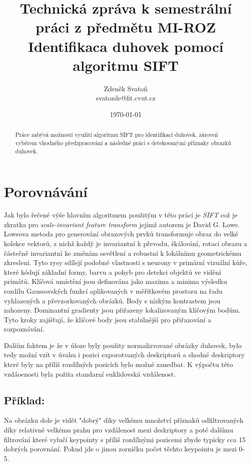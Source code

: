 \documentclass[a4paper,10pt,twocolumn]{article}
\title{Technická zpráva k semestrální práci z předmětu MI-ROZ \\ Identifikaca duhovek pomocí algoritmu SIFT}
\date{\today}
\author{Zdeněk Svatoň\\ svatozde@fit.cvut.cz}
\begin{document}
\maketitle
\begin{abstract}
Práce zabývá možností využití algoritmu SIFT pro identifikaci duhovek, zároveň vyběrem vhodného předzpracování a následné práci s detekovanými příznaky obrazků duhovek.
\end{abstract}

%
\section{Porovnávání}

Jak bylo řečené výše hlavním algoritmem použitým v této prácí je \emph{SIFT} což je zkratka pro \emph{scale-invariant feature transform} jejímž autorem je David G. Lowe.
Loweova metoda pro generování obrazových prvků transformuje obraz do velké kolekce vektorů, z nichž každý je invariantní k převodu, škálování, rotaci obrazu a částečně invariantní ke změnám osvětlení a robustní k lokálnímu geometrickému zkreslení.
Tyto rysy sdílejí podobné vlastnosti s neurony v primární vizuální kůře, které kódují základní formy, barvu a pohyb pro detekci objektů ve vidění primátů.
Klíčová umístění jsou definována jako maxima a minima výsledku rozdílu Gaussovských funkcí aplikovaných v měřítkovém prostoru na řadu vyhlazených a převzorkovaných obrázků. Body s nízkým kontrastem jsou zahozeny.
Dominantní gradienty jsou přiřazeny lokalizovaným klíčovým bodům. Tyto kroky zajišťují, že klíčové body jsou stabilnější pro přiřazování a rozpoznávání.

Dalším faktem je že v úloze byly použity normalizvované obrázky duhovek, bylo tedy možní vzít v úvahu i pozici exporotvaných deskriptorů a shodné deskriptory které byly na příliš rozdílných pozicích bylo možné zanedbat.
K výpočtu této vzdáoenosti byla požita standarní euklidovská vzdálenost.

\subsection{Příklad:}  Na obrázku dole je vidět "dobrý" diky velkému množství příznaků odfiltrovaných díky relativně velkému prahu pro vzdálenost mezi deskriptory a poté dalšímu filtrování které vylučí keypointy s příliš rozdílnými pozicemi zbyde typicky cca 15 dobrých porovnání.
Pokud jde o jinou zorničku počet těchto keypointu je mezi 0-5.
\end{document}
